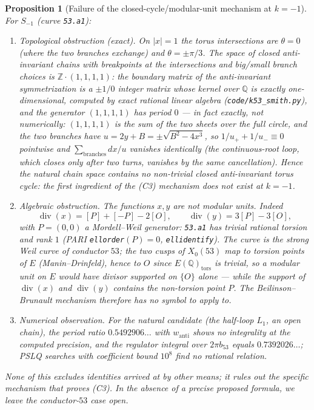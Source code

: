 \documentclass[preprint,12pt]{elsarticle}
\newtheorem{proposition}[theorem]{Proposition}
\theoremstyle{definition}
\theoremstyle{remark}
\newcommand{\Q}{\mathbb{Q}}
\newcommand{\Z}{\mathbb{Z}}
\DeclareMathOperator{\divisor}{div}
\begin{document}
\begin{proposition}[Failure of the closed-cycle/modular-unit mechanism at
$k=-1$]\label{thm:k53}
For $S_{-1}$ (curve \emph{\texttt{53.a1}}):
\begin{enumerate}
  \item \emph{Topological obstruction (exact).} On $|x|=1$ the torus intersections
  are $\theta=0$ (where the two branches \emph{exchange}) and
  $\theta=\pm\pi/3$. The space of closed anti-invariant chains with
  breakpoints at the intersections and big/small branch choices is
  $\Z\cdot(1,1,1,1)$: the boundary matrix of the anti-invariant
  symmetrization is a $\pm1/0$ integer matrix whose kernel over $\Q$ is
  exactly one-dimensional, computed by exact rational linear algebra
  (\texttt{code/k53\_smith.py}), and the generator $(1,1,1,1)$ has period
  $0$ --- in fact exactly, not numerically: $(1,1,1,1)$ is the sum of the
  two sheets over the full circle, and the two branches have
  $u=2y+B=\pm\sqrt{B^2-4x^3}$, so $1/u_++1/u_-\equiv0$ pointwise and
  $\sum_{\mathrm{branches}}dx/u$ vanishes identically (the continuous-root
  loop, which closes only after \emph{two} turns, vanishes by the same
  cancellation). Hence the natural chain space contains
  \emph{no non-trivial closed anti-invariant torus cycle}: the first
  ingredient of the (C3) mechanism does not exist at $k=-1$.
  \item \emph{Algebraic obstruction.} The functions $x,y$ are not modular
  units. Indeed
  \[
    \divisor(x)=[P]+[-P]-2[O],\qquad \divisor(y)=3[P]-3[O],
  \]
  with $P=(0,0)$ a Mordell--Weil \emph{generator}: \texttt{53.a1} has
  trivial rational torsion and rank $1$ (PARI \texttt{ellorder}$(P)=0$,
  \texttt{ellidentify}). The curve is the strong Weil curve of conductor
  $53$; the two cusps of $X_0(53)$ map to torsion points of $E$
  (Manin--Drinfeld), hence to $O$ since $E(\Q)_{\mathrm{tors}}$ is trivial,
  so a modular unit on $E$ would have divisor supported on $\{O\}$ alone ---
  while the support of $\divisor(x)$ and $\divisor(y)$ contains the
  non-torsion point $P$. The Beilinson--Brunault mechanism therefore has no
  symbol to apply to.
  \item \emph{Numerical observation.} For the natural candidate (the
  half-loop $L_1$, an open chain), the period ratio $0.5492906\ldots$ with
  $w_{\mathrm{anti}}$ shows no integrality at the computed precision, and
  the regulator integral over $2\pi b_{53}$ equals $0.7392026\ldots$; PSLQ
  searches with coefficient bound $10^8$ find no rational relation.
\end{enumerate}
None of this excludes identities arrived at by other means; it rules out the
specific mechanism that proves \emph{(C3)}. In the absence of a precise
proposed formula, we leave the conductor-$53$ case open.
\end{proposition}
\end{document}
